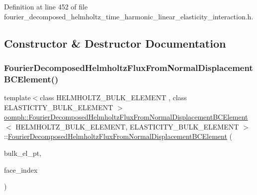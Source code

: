 Definition at line 452 of file fourier\+\_\+decomposed\+\_\+helmholtz\+\_\+time\+\_\+harmonic\+\_\+linear\+\_\+elasticity\+\_\+interaction.\+h.



\subsection{Constructor \& Destructor Documentation}
\mbox{\label{classoomph_1_1FourierDecomposedHelmholtzFluxFromNormalDisplacementBCElement_a01e66914352ffdf578cc6ebcfa760dd4}} 
\subsubsection{\texorpdfstring{Fourier\+Decomposed\+Helmholtz\+Flux\+From\+Normal\+Displacement\+B\+C\+Element()}{FourierDecomposedHelmholtzFluxFromNormalDisplacementBCElement()}\hspace{0.1cm}{\footnotesize\ttfamily [1/2]}}
{\footnotesize\ttfamily template$<$class H\+E\+L\+M\+H\+O\+L\+T\+Z\+\_\+\+B\+U\+L\+K\+\_\+\+E\+L\+E\+M\+E\+NT , class E\+L\+A\+S\+T\+I\+C\+I\+T\+Y\+\_\+\+B\+U\+L\+K\+\_\+\+E\+L\+E\+M\+E\+NT $>$ \\
\hyperlink{classoomph_1_1FourierDecomposedHelmholtzFluxFromNormalDisplacementBCElement}{oomph\+::\+Fourier\+Decomposed\+Helmholtz\+Flux\+From\+Normal\+Displacement\+B\+C\+Element}$<$ H\+E\+L\+M\+H\+O\+L\+T\+Z\+\_\+\+B\+U\+L\+K\+\_\+\+E\+L\+E\+M\+E\+NT, E\+L\+A\+S\+T\+I\+C\+I\+T\+Y\+\_\+\+B\+U\+L\+K\+\_\+\+E\+L\+E\+M\+E\+NT $>$\+::\hyperlink{classoomph_1_1FourierDecomposedHelmholtzFluxFromNormalDisplacementBCElement}{Fourier\+Decomposed\+Helmholtz\+Flux\+From\+Normal\+Displacement\+B\+C\+Element} (\begin{DoxyParamCaption}\item[{\hyperlink{classoomph_1_1FiniteElement}{Finite\+Element} $\ast$const \&}]{bulk\+\_\+el\+\_\+pt,  }\item[{const int \&}]{face\+\_\+index }\end{DoxyParamCaption})}



